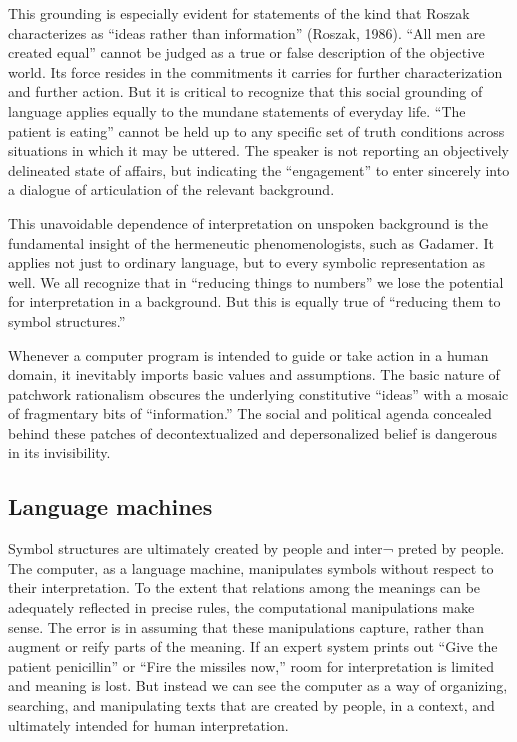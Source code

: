 \documentclass[12pt]{article}
\begin{document}
This grounding is especially evident for statements of the kind that Roszak characterizes as “ideas rather than information” (Roszak, 1986). “All men are created equal” cannot be judged as a true or false description of the objective world. Its force resides in the commitments it carries for further characterization and further action. But it is critical to recognize that this social grounding of language applies equally to the mundane statements of everyday life. “The patient is eating” cannot be held up to any specific set of truth conditions across situations in which it may be uttered. The speaker is not reporting an objectively delineated state of affairs, but indicating the “engagement” to enter sincerely into a dialogue of articulation of the relevant background.

This unavoidable dependence of interpretation on unspoken background is the fundamental insight of the hermeneutic phenomenologists, such as Gadamer. It applies not just to ordinary language, but to every symbolic representation as well. We all recognize that in “reducing things to numbers” we lose the potential for interpretation in a background. But this is equally true of “reducing them to symbol structures.”

Whenever a computer program is intended to guide or take action in a human domain, it inevitably imports basic values and assumptions. The basic nature of patchwork rationalism obscures the underlying constitutive “ideas” with a mosaic of fragmentary bits of “information.” The social and political agenda concealed behind these patches of decontextualized and depersonalized belief is dangerous in its invisibility.

\subsection{Language machines}

Symbol structures are ultimately created by people and inter¬ preted by people. The computer, as a language machine, manipulates symbols without respect to their interpretation. To the extent that relations among the meanings can be adequately reflected in precise rules, the computational manipulations make sense. The error is in assuming that these manipulations capture, rather than augment or reify parts of the meaning. If an expert system prints out “Give the patient penicillin” or “Fire the missiles now,” room for interpretation is limited and meaning is lost. But instead we can see the computer as a way of organizing, searching, and manipulating texts that are created by people, in a context, and ultimately intended for human interpretation.
\end{document}
